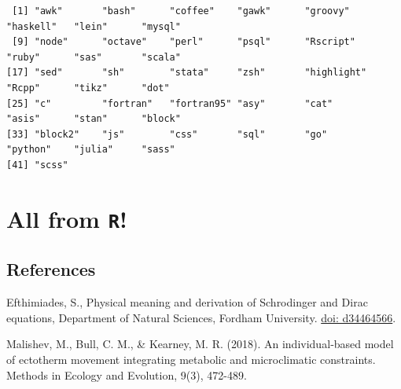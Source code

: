 \documentclass[10,portrait]{article}
\begin{document}
\begin{verbatim}
 [1] "awk"       "bash"      "coffee"    "gawk"      "groovy"    "haskell"   "lein"      "mysql"    
 [9] "node"      "octave"    "perl"      "psql"      "Rscript"   "ruby"      "sas"       "scala"    
[17] "sed"       "sh"        "stata"     "zsh"       "highlight" "Rcpp"      "tikz"      "dot"      
[25] "c"         "fortran"   "fortran95" "asy"       "cat"       "asis"      "stan"      "block"    
[33] "block2"    "js"        "css"       "sql"       "go"        "python"    "julia"     "sass"     
[41] "scss"     
\end{verbatim}

\section{\texorpdfstring{All from
\texttt{R}!}{All from R!}}\label{all-from-r}

\newpage  

\subsection{References}\label{references}

Efthimiades, S., Physical meaning and derivation of Schrodinger and
Dirac equations, Department of Natural Sciences, Fordham University.
\href{https://arxiv.org/vc/quant-ph/papers/0607/0607001v1.pdf}{doi:
d34464566}.

Malishev, M., Bull, C. M., \& Kearney, M. R. (2018). An individual‐based
model of ectotherm movement integrating metabolic and microclimatic
constraints. Methods in Ecology and Evolution, 9(3), 472-489.

\printbibliography
\end{document}
